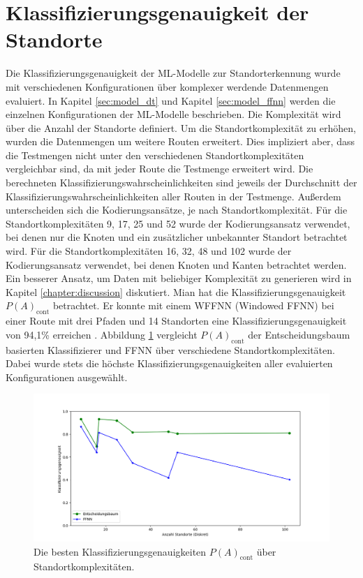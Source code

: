 \section{Klassifizierungsgenauigkeit der Standorte}
Die Klassifizierungsgenauigkeit der ML-Modelle zur Standorterkennung wurde mit verschiedenen Konfigurationen über komplexer werdende Datenmengen evaluiert.
In Kapitel \ref{sec:model_dt} und Kapitel \ref{sec:model_ffnn} werden die einzelnen Konfigurationen der ML-Modelle beschrieben.
Die Komplexität wird über die Anzahl der Standorte definiert.
Um die Standortkomplexität zu erhöhen, wurden die Datenmengen um weitere Routen erweitert.
Dies impliziert aber, dass die Testmengen nicht unter den verschiedenen Standortkomplexitäten vergleichbar sind, da mit jeder Route die Testmenge erweitert wird.
Die berechneten Klassifizierungswahrscheinlichkeiten sind jeweils der Durchschnitt der Klassifizierungswahrscheinlichkeiten aller Routen in der Testmenge.
\newline
\newline
Außerdem unterscheiden sich die Kodierungsansätze, je nach Standortkomplexität.
Für die Standortkomplexitäten 9, 17, 25 und 52 wurde der Kodierungsansatz verwendet, bei denen nur die Knoten und ein zusätzlicher unbekannter Standort betrachtet wird.
Für die Standortkomplexitäten 16, 32, 48 und 102 wurde der Kodierungsansatz verwendet, bei denen Knoten und Kanten betrachtet werden.
Ein besserer Ansatz, um Daten mit beliebiger Komplexität zu generieren wird in Kapitel \ref{chapter:discussion} diskutiert.
\newline
\newline
Mian hat die Klassifizierungsgenauigkeit $P(A)_{\text{cont}}$ betrachtet.
Er konnte mit einem WFFNN (Windowed FFNN) bei einer Route mit drei Pfaden und 14 Standorten eine Klassifizierungsgenauigkeit von 94,1\% erreichen \cite{naveedThesis}.
Abbildung \ref{fig:best_dt_acc_vs_knn_using_cont} vergleicht $P(A)_{\text{cont}}$ der Entscheidungsbaum basierten Klassifizierer und FFNN über verschiedene Standortkomplexitäten.
Dabei wurde stets die höchste Klassifizierungsgenauigkeiten aller evaluierten Konfigurationen ausgewählt.
\begin{figure}[h!]
    \centering
    \includegraphics[width=\linewidth]{images/best_dt_vs_best_ffnn_over_num_loc_using_acc_cont.png}
    \caption{Die besten Klassifizierungsgenauigkeiten $P(A)_{\text{cont}}$ über Standortkomplexitäten.}
    \label{fig:best_dt_acc_vs_knn_using_cont}
\end{figure}
